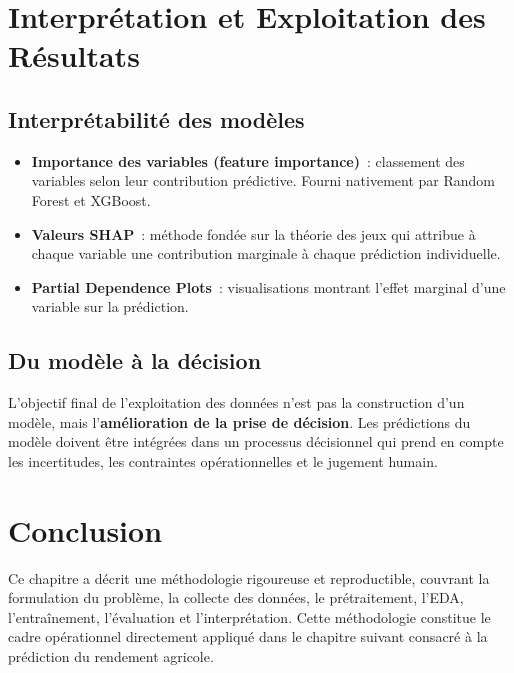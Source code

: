 \section{Interprétation et Exploitation des Résultats}

\subsection{Interprétabilité des modèles}

\begin{itemize}[leftmargin=1.5cm, itemsep=4pt]
  \item \textbf{Importance des variables (feature importance)}~: classement des variables selon leur contribution prédictive. Fourni nativement par Random Forest et XGBoost.
  \item \textbf{Valeurs SHAP}~: méthode fondée sur la théorie des jeux qui attribue à chaque variable une contribution marginale à chaque prédiction individuelle.
  \item \textbf{Partial Dependence Plots}~: visualisations montrant l'effet marginal d'une variable sur la prédiction.
\end{itemize}

\subsection{Du modèle à la décision}

L'objectif final de l'exploitation des données n'est pas la construction d'un modèle, mais l'\textbf{amélioration de la prise de décision}. Les prédictions du modèle doivent être intégrées dans un processus décisionnel qui prend en compte les incertitudes, les contraintes opérationnelles et le jugement humain.

\section{Conclusion}

Ce chapitre a décrit une méthodologie rigoureuse et reproductible, couvrant la formulation du problème, la collecte des données, le prétraitement, l'EDA, l'entraînement, l'évaluation et l'interprétation. Cette méthodologie constitue le cadre opérationnel directement appliqué dans le chapitre suivant consacré à la prédiction du rendement agricole.

\newpage
